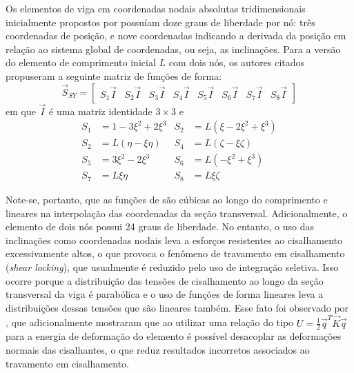 Os elementos de viga em coordenadas nodais absolutas tridimensionais inicialmente propostos por  possuíam doze
graus de liberdade por nó: três coordenadas de posição, e nove coordenadas indicando a derivada da posição em relação ao sistema
global de coordenadas, ou seja, as inclinações. Para a versão do elemento de comprimento inicial $L$ com dois nós, os autores citados propuseram a seguinte matriz 
de funções de forma:
\begin{equation}
    \vec{S}_{SY} = \begin{bmatrix}
        S_1\vec{I} & S_2\vec{I} & S_3\vec{I} & S_4\vec{I} & S_5\vec{I} & S_6\vec{I} & S_7\vec{I} & S_8\vec{I}
    \end{bmatrix}    
\end{equation}
em que $\vec{I}$ é uma matriz identidade $3\times 3$ e 
\begin{align}
    S_1 &= 1-3\xi^2+2\xi^3 & S_2 &= L(\xi-2\xi^2+\xi^3) \\
    S_2 &=L(\eta-\xi\eta) & S_4 &= L(\zeta-\xi\zeta) \\
    S_5 &= 3\xi^2-2\xi^3 & S_6 &= L(-\xi^2+\xi^3) \\
    S_7 &= L\xi\eta & S_8 &= L\xi\zeta
\end{align}

Note-se, portanto, que as funções de  são cúbicas ao longo do comprimento e lineares na interpolação
das coordenadas da seção transversal. Adicionalmente, o elemento de dois nós possui 24 graus de liberdade. No entanto, o uso das inclinações
como coordenadas nodais leva a esforços resistentes ao cisalhamento excessivamente altos, o que provoca
o fenômeno de travamento em cisalhamento (\textit{shear locking}), que usualmente é reduzido pelo uso de integração seletiva. 
Isso ocorre porque a distribuição das tensões de cisalhamento ao longo da 
seção transversal da viga é parabólica e o uso de funções de forma lineares leva a distribuições dessas tensões que são lineares também. Esse
fato foi observado por , que adicionalmente mostraram que ao utilizar uma relação do 
tipo $U = \frac{1}{2}\vec{q}^T\vec{K}\vec{q}$ para a energia de deformação do elemento é possível desacoplar as deformações normais das
cisalhantes, o que reduz resultados incorretos associados ao travamento em cisalhamento.

